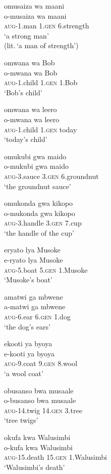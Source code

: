 \ea \label{ex-poss-NC}
\begin{xlist}	
\ex \label{ex-poss-NC1a}
    \glll 	omusaiza	wa	maani\\
    		o-musaiza	wa	maani\\
	    	\textsc{aug}-1.man	1.\textsc{gen}	6.strength\\
    \glt	‘a strong man' \\(lit.\,`a man of strength')

    \ex \label{ex-poss-NC1b}
    \glll 	omwana	wa	Bob\\
    		 o-mwana	wa	Bob\\
   		\textsc{aug}-1.child	1.\textsc{gen}	1.Bob\\
    \glt 	‘Bob’s child’
    
   \ex \label{ex-poss-NC2b}
  \glll omwana wa leero\\
  	o-mwana wa leero\\
   \textsc{aug}-1.child	1.\textsc{gen}		today\\
    \glt ‘today’s child’
    
    \ex \label{ex-poss-NC3a}
\glll		omukubi		gwa		maido\\
		o-mukubi	 	gwa		maido\\
   		\textsc{aug}-3.sauce 	3.\textsc{gen}	6.groundnut\\
    \glt	‘the groundnut sauce’

\ex \label{ex-poss-NC3b}
    \glll	omukonda   		gwa		kikopo\\
    		o-mukonda   		gwa		kikopo\\
		\textsc{aug}-3.handle       	3.\textsc{gen}	7.cup\\
    \glt	‘the handle of the cup’

\ex \label{ex-poss-NC5b}
    \glll 	eryato		lya		Musoke\\
    		e-ryato		lya		Musoke\\
  		 \textsc{aug}-5.boat	5.\textsc{gen}	1.Musoke\\
    \glt 	‘Musoke's boat’
    
    
\ex \label{ex-poss-NC6b}
    \glll	amatwi		ga		mbwene\\
    		a-matwi		ga		mbwene\\
		\textsc{aug}-6.ear		6.\textsc{gen}	1.dog\\
    \glt ‘the dog's ears’

\ex \label{ex-poss-NC9a}
    \glll ekooti		ya		byoya\\
    e-kooti		ya		byoya\\
  \textsc{aug}-9.coat	9.\textsc{gen}		8.wool\\
    \glt  `a wool coat'

\ex \label{ex-poss-NC14}
    \glll obusanso bwa musaale\\
    o-busanso bwa musaale\\
 \textsc{aug}-14.twig 14.\textsc{gen} 3.tree\\
    \glt  ‘tree twigs'
    
\ex \label{ex-poss-NC15}
    \glll okufa kwa Walusimbi\\
    o-kufa kwa Walusimbi\\
	\textsc{aug}-15.death 15.\textsc{gen} 1.Walusimbi\\
    \glt  ‘Walusimbi's death’
\end{xlist}
